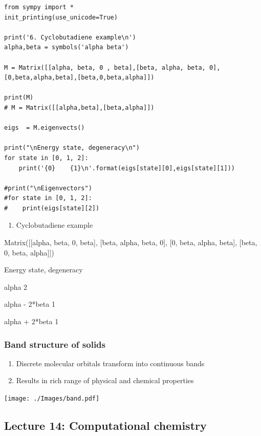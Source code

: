 \documentclass[11pt]{article}
\begin{document}
\begin{verbatim}
from sympy import *
init_printing(use_unicode=True)

print('6. Cyclobutadiene example\n')
alpha,beta = symbols('alpha beta')

M = Matrix([[alpha, beta, 0 , beta],[beta, alpha, beta, 0],[0,beta,alpha,beta],[beta,0,beta,alpha]])

print(M)
# M = Matrix([[alpha,beta],[beta,alpha]])

eigs  = M.eigenvects()

print("\nEnergy state, degeneracy\n")
for state in [0, 1, 2]:
    print('{0}    {1}\n'.format(eigs[state][0],eigs[state][1]))

#print("\nEigenvectors")
#for state in [0, 1, 2]:
#    print(eigs[state][2])

\end{verbatim}

\begin{enumerate}
\item Cyclobutadiene example
\end{enumerate}

Matrix([[alpha, beta, 0, beta], [beta, alpha, beta, 0], [0, beta, alpha, beta], [beta, 0, beta, alpha]])

Energy state, degeneracy

alpha    2

alpha - 2*beta    1

alpha + 2*beta    1

\subsubsection{Band structure of solids}
\label{sec:orgdad3bae}
\begin{enumerate}
\item Discrete molecular orbitals transform into continuous bands
\item Results in rich range of physical and chemical properties
\end{enumerate}

\begin{center}
\texttt{[image: ./Images/band.pdf]}
\end{center}

\subsection{Lecture 14: Computational chemistry}
\label{sec:orge239ba4}
\end{document}
